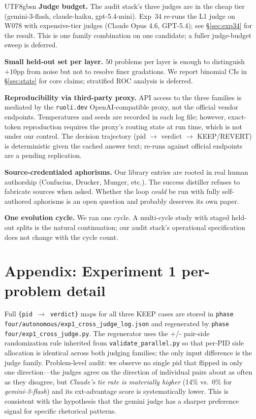 \documentclass{article}
\begin{document}
\begin{CJK*}{UTF8}{gbsn}
\textbf{Judge budget.} The audit stack's three judges are in the cheap
tier (gemini-3-flash, claude-haiku, gpt-5.4-mini). Exp~34 re-runs the
L1 judge on W078 with expensive-tier judges (Claude Opus 4.6, GPT-5.4);
see \S\ref{sec:exp34} for the result. This is one family combination
on one candidate; a fuller judge-budget sweep is deferred.

\textbf{Small held-out set per layer.} \(50\) problems per layer is
enough to distinguish \(+10\)pp from noise but not to resolve finer
gradations. We report binomial CIs in
\S\ref{sec:stats} for core claims; stratified ROC analysis is deferred.

\textbf{Reproducibility via third-party proxy.} API access to the
three families is mediated by the \texttt{ruoli.dev} OpenAI-compatible
proxy, not the official vendor endpoints. Temperatures and seeds are
recorded in each log file; however, exact-token reproduction requires
the proxy's routing state at run time, which is not under our control.
The decision trajectory (pid $\to$ verdict $\to$ KEEP/REVERT) is
deterministic given the cached answer text; re-runs against official
endpoints are a pending replication.

\textbf{Source-credentialed aphorisms.} Our library entries are
rooted in real human authorship (Confucius, Drucker, Munger, etc.).
The success distiller refuses to fabricate sources when asked. Whether
the loop \emph{could} be run with fully self-authored aphorisms is an
open question and probably deserves its own paper.

\textbf{One evolution cycle.} We ran one cycle. A multi-cycle study
with staged held-out splits is the natural continuation; our audit
stack's operational specification does not change with the cycle count.

\section{Appendix: Experiment 1 per-problem detail}
\label{app:crossjudge}

Full \texttt{\{pid \(\to\) verdict\}} maps for all three KEEP cases
are stored in
\texttt{phase four/autonomous/exp1\_cross\_judge\_log.json} and
regenerated by
\texttt{phase four/exp1\_cross\_judge.py}. The regenerator uses the
\(+\)/- pair-side randomization rule inherited from
\texttt{validate\_parallel.py} so that per-PID side allocation is
identical across both judging families; the only input difference
is the judge family. Problem-level audit: we observe no single
pid that flipped in only one direction—the judges agree on the
direction of individual pairs about as often as they disagree,
but \emph{Claude's tie rate is materially higher} (14\% vs.\ 0\%
for \emph{gemini-3-flash}) and its ext-advantage score is
systematically lower. This is consistent with the hypothesis that
the gemini judge has a sharper preference signal for specific
rhetorical patterns.


\end{CJK*}
\end{document}
